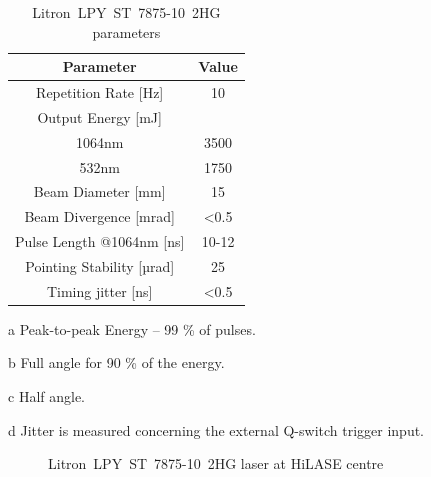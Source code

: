 \begin{table}[h!] 
\centering
        \caption[Litron~LPY~ST~7875-10~2HG parameters]{Litron~LPY~ST~7875-10~2HG parameters \protect\cite{litronmanual}}
    \begin{threeparttable}
        \begin{tabular}{|c | c|} 
        \hline
            \textbf{Parameter} & \textbf{Value} \\ [0.5ex] 
        \hline
        Repetition Rate [Hz] & 10  \\ 
        \hline
            Output Energy [mJ] & \\
            1064nm & 3500 \tnote{a} \\
            532nm & 1750 \\
        \hline
            Beam Diameter [mm] & 15  \\
        \hline
            Beam Divergence [mrad] & \textless 0.5 \tnote{b} \\ 
        \hline
            Pulse Length @1064nm [ns] & 10-12 \\
        \hline
            Pointing Stability [µrad] & 25 \tnote{c} \\
        \hline
            Timing jitter [ns] & \textless 0.5 \tnote{d}  \\
        \hline
        \end{tabular}
        \begin{tablenotes}
            \small
            \item[a] Peak-to-peak Energy -- 99 \% of pulses. 
            \item[b] Full angle for 90 \% of the energy.
            \item[c] Half angle.
            \item[d] Jitter is measured concerning the external Q-switch trigger input.
        \end{tablenotes}
        
    \end{threeparttable}

\label{tab:litronparameters}
\end{table}

\begin{figure}[h]
    \centering
    \noindent{}
    \caption{Litron~LPY~ST~7875-10~2HG laser at HiLASE centre}
    \label{fig:litron}
\end{figure}





